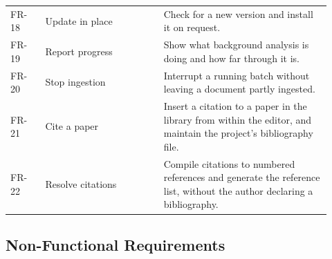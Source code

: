 \documentclass[12pt,a4paper]{report}
\begin{document}
\begin{longtable}{@{}p{0.10\linewidth}p{0.34\linewidth}p{0.48\linewidth}@{}}
FR-18 & Update in place & Check for a new version and install it on request. \\
FR-19 & Report progress & Show what background analysis is doing and how far
        through it is. \\
FR-20 & Stop ingestion & Interrupt a running batch without leaving a document
        partly ingested. \\
FR-21 & Cite a paper & Insert a citation to a paper in the library from within
        the editor, and maintain the project's bibliography file. \\
FR-22 & Resolve citations & Compile citations to numbered references and
        generate the reference list, without the author declaring a
        bibliography. \\
\bottomrule
\end{longtable}

\subsection{Non-Functional Requirements}
\end{document}
